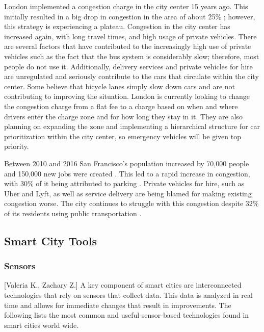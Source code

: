 \documentclass[12pt]{article}                               %
\begin{document}
London implemented a congestion charge in the city center 15 years ago. This initially resulted in a big drop in congestion in the area of about 25\% \cite{Badstuber2018LondonIt}; however, this strategy is experiencing a plateau. Congestion in the city center has increased again, with long travel times, and high usage of private vehicles. There are several factors that have contributed to the increasingly high use of private vehicles such as the fact that the bus system is considerably slow; therefore, most people do not use it. Additionally, delivery services and private vehicles for hire are unregulated and seriously contribute to the cars that circulate within the city center. Some believe that bicycle lanes simply slow down cars and are not contributing to improving the situation. London is currently looking to change the congestion charge from a flat fee to a charge based on when and where drivers enter the charge zone and for how long they stay in it. They are also planning on expanding the zone and implementing a hierarchical structure for car prioritization within the city center, so emergency vehicles will be given top priority. 

Between 2010 and 2016 San Francisco's population increased by 70,000 people and 150,000 new jobs were created \cite{Marshall2018UberComplicated}. This led to a rapid increase in congestion, with 30\% of it being attributed to parking \cite{Marshall2018UberComplicated}. Private vehicles for hire, such as Uber and Lyft, as well as service delivery are being blamed for making existing congestion worse. The city continues to struggle with this congestion despite 32\% of its residents using public transportation \cite{Marshall2018UberComplicated}. 

\subsection{Smart City Tools} 
\subsubsection{Sensors}[Valeria K., Zachary Z.] \label{sec:smart_city_sensors}
A key component of smart cities are interconnected technologies that rely on sensors that collect data. This data is analyzed in real time and allows for immediate changes that result in improvements. The following lists the most common and useful sensor-based technologies found in smart cities world wide. 
\end{document}
